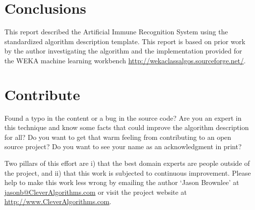 \documentclass[a4paper, 11pt]{article}
\makeatletter
\newcommand{\myreportauthor}{Jason Brownlee}
\newcommand{\myreportemail}{jasonb@CleverAlgorithms.com}
\newcommand{\myreportwebsite}{http://www.CleverAlgorithms.com}
\makeatother
\begin{document}
% 
% 
\section{Conclusions}
\label{sec:conclusions}
This report described the Artificial Immune Recognition System using the standardized algorithm description template. This report is based on prior work by the author investigating the algorithm \cite{Brownlee2005, Brownlee2008} and the implementation provided for the WEKA machine learning workbench \url{http://wekaclassalgos.sourceforge.net/}.

% 
% 
\section{Contribute}
\label{sec:contribute}
Found a typo in the content or a bug in the source code? 
Are you an expert in this technique and know some facts that could improve the algorithm description for all?
Do you want to get that warm feeling from contributing to an open source project? 
Do you want to see your name as an acknowledgment in print?

Two pillars of this effort are i) that the best domain experts are people outside of the project, and ii) that this work is subjected to continuous improvement. 
Please help to make this work less wrong by emailing the author `\myreportauthor' at \url{\myreportemail} or visit the project website at \url{\myreportwebsite}.



\end{document}
